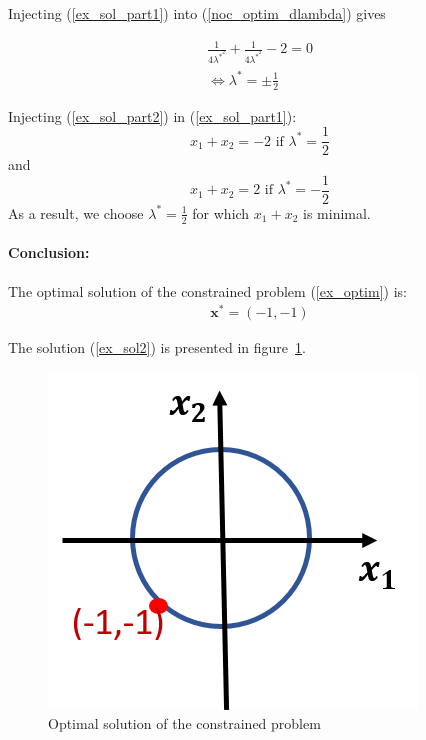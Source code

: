 \documentclass[twoside]{article}
\begin{document}
Injecting (\ref{ex_sol_part1}) into (\ref{noc_optim_dlambda}) gives 

\begin{equation} \label{ex_sol_part2}
    \begin{array}{c}
       \frac{1}{4 \lambda^*^2} + \frac{1}{4 \lambda^*^2} - 2 = 0 \\
        \iff \lambda^* = \pm \frac{1}{2}
    \end{array}
\end{equation}

Injecting (\ref{ex_sol_part2}) in (\ref{ex_sol_part1}): \\
\[x_1 + x_2 = -2 \text{ if } \lambda^* = \frac{1}{2} \] and
\[x_1 + x_2 = 2 \text{ if } \lambda^* = -\frac{1}{2} \] As a result, we choose $\lambda^* = \frac{1}{2} $ for which $x_1 + x_2$ is minimal.

\paragraph{Conclusion:} The optimal solution of the constrained problem (\ref{ex_optim}) is:
\begin{equation}\label{ex_sol2}
    \begin{array}{c}
    \mathbf{x}^* = (-1, -1)
    \end{array}
\end{equation}

The solution (\ref{ex_sol2}) is presented in figure~\ref{fig:ex_sol}.

\begin{figure}[ht]
    \centering
    \includegraphics[scale = 0.7]{Constrainted_Optim2.png}
    \caption{Optimal solution of the constrained problem}
    \label{fig:ex_sol}
\end{figure}
\end{document}
